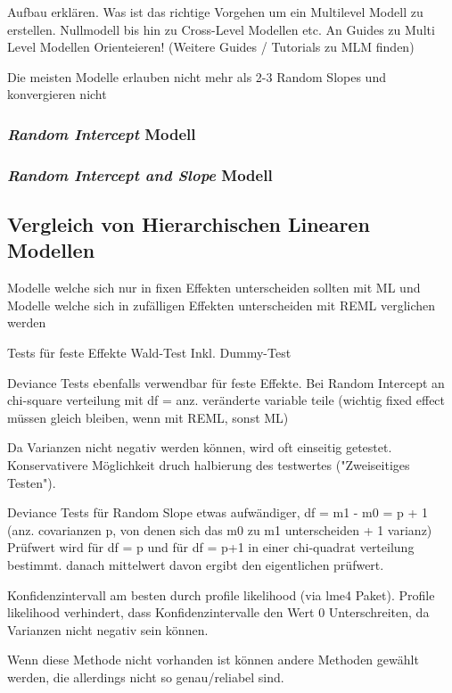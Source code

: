 \documentclass[12pt]{article}\usepackage[]{graphicx}\usepackage[]{color}
\begin{document}
Aufbau erklären. Was ist das richtige Vorgehen um ein Multilevel Modell zu erstellen. Nullmodell bis hin zu Cross-Level Modellen etc. An Guides zu Multi Level Modellen Orienteieren! \cite{SnijdersTomA.B2012Ma:a} (Weitere Guides / Tutorials zu MLM finden)

Die meisten Modelle erlauben nicht mehr als 2-3 Random Slopes und konvergieren nicht \cite{SnijdersTomA.B2012Ma:a}

\subsubsection{\textit{Random Intercept} Modell}
\subsubsection{\textit{Random Intercept and Slope} Modell}

\subsection{Vergleich von Hierarchischen Linearen Modellen}
Modelle welche sich nur in fixen Effekten unterscheiden sollten mit ML und Modelle welche sich in zufälligen Effekten unterscheiden mit REML verglichen werden \cite{SnijdersTomA.B2012Ma:a}

Tests für feste Effekte Wald-Test \cite{SnijdersTomA.B2012Ma:a} Inkl. Dummy-Test

Deviance Tests ebenfalls verwendbar für feste Effekte. Bei Random Intercept an chi-square verteilung mit df = anz. veränderte variable teile (wichtig fixed effect müssen gleich bleiben, wenn mit REML, sonst ML)

Da Varianzen nicht negativ werden können, wird oft einseitig getestet. Konservativere Möglichkeit druch halbierung des testwertes ("Zweiseitiges Testen").


Deviance Tests für Random Slope etwas aufwändiger, df = m1 - m0 = p + 1 (anz. covarianzen p, von denen sich das m0 zu m1 unterscheiden + 1 varianz) Prüfwert wird für df = p und für df = p+1 in einer chi-quadrat verteilung bestimmt. danach mittelwert davon ergibt den eigentlichen prüfwert. 

Konfidenzintervall am besten durch profile likelihood (via lme4 Paket). Profile likelihood verhindert, dass Konfidenzintervalle den Wert 0 Unterschreiten, da Varianzen nicht negativ sein können. 

Wenn diese Methode nicht vorhanden ist können andere Methoden gewählt werden, die allerdings nicht so genau/reliabel sind.
\end{document}
